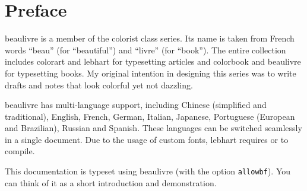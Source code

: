 \documentclass[English,Chinese,French,allowbf,puretext]{beaulivre}
\theoremstyle{basic}
\theoremstyle{emphasis}
\theoremstyle{simple}
\providecommand{\colorist}{\textsf{colorist}}
\providecommand{\colorart}{\textsf{colorart}}
\providecommand{\colorbook}{\textsf{colorbook}}
\providecommand{\lebhart}{\textsf{lebhart}}
\providecommand{\beaulivre}{\textsf{beaulivre}}
\begin{document}
\frontmatter

\begin{titlepage} %
%
\end{titlepage}%
\cleardoublepage%


\chapter*{Preface}

\beaulivre{} is a member of the \colorist{} class series. Its name is taken from French words ``beau'' (for ``beautiful'') and ``livre'' (for ``book''). The entire collection includes \colorart{} and \lebhart{} for typesetting articles and \colorbook{} and \beaulivre{} for typesetting books. My original intention in designing this series was to write drafts and notes that look colorful yet not dazzling.

\beaulivre{} has multi-language support, including Chinese (simplified and traditional), English, French, German, Italian, Japanese, Portuguese (European and Brazilian), Russian and Spanish. These languages can be switched seamlessly in a single document. Due to the usage of custom fonts, \lebhart{} requires  or  to compile.

This documentation is typeset using \beaulivre{} (with the option \texttt{allowbf}). You can think of it as a short introduction and demonstration.
\end{document}

